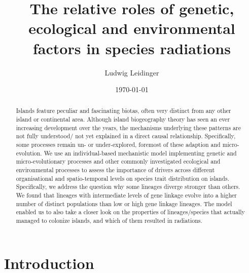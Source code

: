 \documentclass[a4paper]{scrartcl}
\title{The relative roles of genetic, ecological and environmental factors in species radiations}
\author{Ludwig Leidinger}
\date{\today}
\begin{document}
\maketitle

\begin{abstract}
  Islands feature peculiar and fascinating biotas, often very distinct from any other island or continental area.
  Although island biogeography theory has seen an ever increasing development over the years,
  the mechanisms underlying these patterns are not fully understood/ not yet explained in a direct causal relationship.
  Specifically, some processes remain un- or under-explored, foremost of these adaption and micro-evolution.
  We use an individual-based mechanistic model implementing genetic and micro-evolutionary processes and other commonly investigated ecological and
  environmental processes to assess the importance of drivers across different organisational and spatio-temporal levels
  on species trait distribution on islands.
  Specifically, we address the question why some lineages diverge stronger than others.
  We found that lineages with intermediate levels of gene linkage evolve into a higher number of distinct populations
  than low or high gene linkage lineages.
  The model enabled us to also take a closer look on the properties of lineages/species that actually managed to colonize islands,
  and which of them resulted in radiations.
  
  
\end{abstract}

\section{Introduction}



\end{document}
